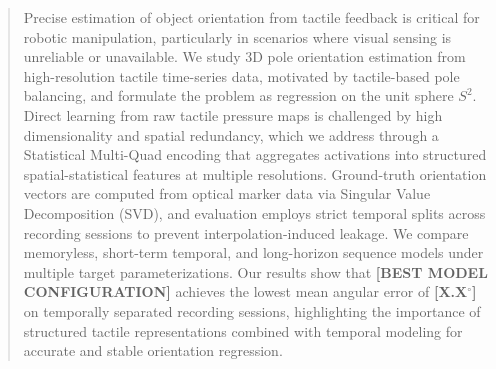 \documentclass{article}
\begin{document}

\printAffiliationsAndNotice{\icmlEqualContribution} 

\begin{abstract}
    Precise estimation of object orientation from tactile feedback is critical for robotic manipulation, particularly in scenarios where visual sensing is unreliable or unavailable. We study 3D pole orientation estimation from high-resolution tactile time-series data, motivated by tactile-based pole balancing, and formulate the problem as regression on the unit sphere $S^2$. Direct learning from raw tactile pressure maps is challenged by high dimensionality and spatial redundancy, which we address through a Statistical Multi-Quad encoding that aggregates activations into structured spatial-statistical features at multiple resolutions. Ground-truth orientation vectors are computed from optical marker data via Singular Value Decomposition (SVD), and evaluation employs strict temporal splits across recording sessions to prevent interpolation-induced leakage. We compare memoryless, short-term temporal, and long-horizon sequence models under multiple target parameterizations. Our results show that \textbf{[BEST MODEL CONFIGURATION]} achieves the lowest mean angular error of \textbf{[X.X$^\circ$]} on temporally separated recording sessions, highlighting the importance of structured tactile representations combined with temporal modeling for accurate and stable orientation regression.
    \end{abstract}
\end{document}
